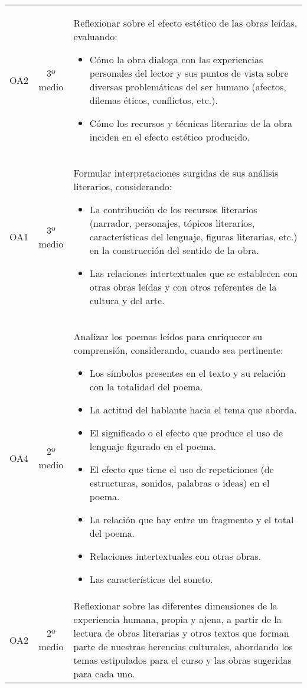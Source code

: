 \documentclass[spanish]{textolivre}
\begin{document}
\begin{small}
\begin{longtable}{p{2cm}cp{7cm}}
OA2 & 3º medio & Reflexionar sobre el efecto estético de las obras leídas, evaluando: 
\begin{itemize}
\item Cómo la obra dialoga con las experiencias personales del lector y sus puntos de vista sobre diversas problemáticas del ser humano (afectos, dilemas éticos, conflictos, etc.).
\item Cómo los recursos y técnicas literarias de la obra inciden en el efecto estético producido.
\end{itemize}
\\
OA1 & 3º medio & Formular interpretaciones surgidas de sus análisis literarios, considerando:
\begin{itemize}
\item La contribución de los recursos literarios (narrador, personajes, tópicos literarios, características del lenguaje, figuras literarias, etc.) en la construcción del sentido de la obra.
\item Las relaciones intertextuales que se establecen con otras obras leídas y con otros referentes de la cultura y del arte.
\end{itemize}
\\
OA4 & 2º medio & Analizar los poemas leídos para enriquecer su comprensión, considerando, cuando sea pertinente:
\begin{itemize}
\item Los símbolos presentes en el texto y su relación con la totalidad del poema.
\item La actitud del hablante hacia el tema que aborda.
\item El significado o el efecto que produce el uso de lenguaje figurado en el poema.
\item El efecto que tiene el uso de repeticiones (de estructuras, sonidos, palabras o ideas) en el poema.
\item La relación que hay entre un fragmento y el total del poema.
\item Relaciones intertextuales con otras obras.
\item Las características del soneto.
\end{itemize}
 \\
OA2 & 2º medio & Reflexionar sobre las diferentes dimensiones de la experiencia humana, propia y ajena, a partir de la lectura de obras literarias y otros textos que forman parte de nuestras herencias culturales, abordando los temas estipulados para el curso y las obras sugeridas para cada uno. \\

\end{longtable}
\end{small}
\end{document}
